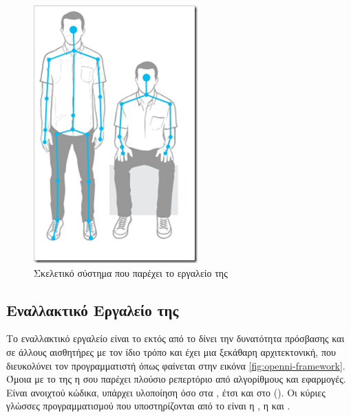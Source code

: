 \begin{figure}[H]
    \centering
    \includegraphics[height=.35\textheight]{fig/microsoft-skeleton.png}
    \caption{Σκελετικό σύστημα που παρέχει το εργαλείο της \protect\footnotemark}
    \label{fig:microsoft-sdk-skeleton}
\end{figure}

\subsection{\texorpdfstring{Εναλλακτικό Εργαλείο της }{}}

Το εναλλακτικό εργαλείο είναι το  εκτός από το  δίνει την δυνατότητα πρόσβασης και σε άλλους αισθητήρες με τον ίδιο τρόπο και έχει μια ξεκάθαρη αρχιτεκτονική, που διευκολύνει τον προγραμματιστή όπως φαίνεται στην εικόνα \ref{fig:openni-framework}. Όμοια με το  της  η  σου παρέχει πλούσιο ρεπερτόριο από αλγορίθμους και εφαρμογές. Είναι ανοιχτού κώδικα, υπάρχει υλοποίηση όσο στα , έτσι και στο  (). Οι κύριες γλώσσες προγραμματισμού  που υποστηρίζονται από το  είναι η , η  και .

